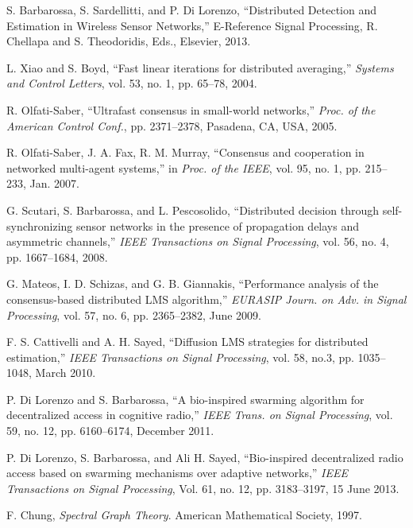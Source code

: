 \documentclass[10pt,twocolumn]{IEEEtran}
\begin{document}
\begin{thebibliography}{1}

S. Barbarossa, S. Sardellitti, and P. Di Lorenzo, ``Distributed Detection and Estimation in Wireless Sensor Networks,'' E-Reference Signal Processing, R. Chellapa and S. Theodoridis, Eds., Elsevier, 2013.

L. Xiao and S. Boyd, ``Fast linear iterations for distributed averaging,'' \textit{Systems and Control Letters}, vol. 53, no. 1, pp. 65--78, 2004.

R. Olfati-Saber, ``Ultrafast consensus in small-world networks,'' {\it Proc. of the American Control Conf.}, pp. 2371--2378, Pasadena, CA, USA, 2005.

R. Olfati-Saber, J. A. Fax, R. M. Murray, ``Consensus and cooperation in networked multi-agent systems,''
in {\it Proc. of the IEEE}, vol. 95, no. 1, pp. 215--233, Jan. 2007.

G. Scutari, S. Barbarossa, and L. Pescosolido, ``Distributed decision through self-synchronizing sensor networks in the presence of propagation delays and asymmetric channels,'' {\it IEEE Transactions on Signal Processing}, vol. 56, no. 4, pp. 1667--1684, 2008.

G. Mateos, I. D. Schizas, and G. B. Giannakis, ``Performance analysis of the consensus-based distributed LMS algorithm,'' {\it EURASIP Journ. on Adv. in Signal Processing}, vol. 57, no. 6, pp. 2365--2382, June 2009.

F. S. Cattivelli and A. H. Sayed, ``Diffusion LMS strategies for distributed
estimation,'' {\it IEEE Transactions on Signal Processing}, vol. 58, no.3, pp. 1035--1048, March 2010.

P. Di Lorenzo and S. Barbarossa, ``A bio-inspired swarming algorithm for decentralized access in cognitive radio,'' {\it IEEE Trans. on Signal Processing}, vol. 59, no. 12, pp. 6160--6174, December 2011.

P. Di Lorenzo, S. Barbarossa, and Ali H. Sayed, ``Bio-inspired decentralized radio access based on swarming mechanisms over adaptive networks,'' {\it IEEE Transactions on Signal Processing}, Vol. 61, no. 12, pp. 3183--3197, 15 June 2013.

F. Chung, {\it Spectral Graph Theory}. American Mathematical Society, 1997.


\end{thebibliography}
\end{document}
